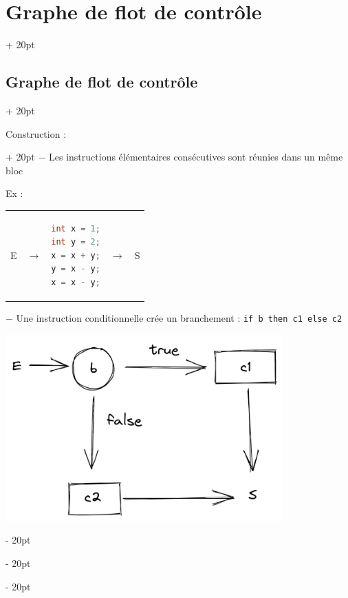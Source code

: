 \documentclass[a4paper, 12pt, twoside]{article}
\newcommand{\ind}[1][20pt]{\advance\leftskip + #1}
\newcommand{\deind}[1][20pt]{\advance\leftskip - #1}
\newenvironment{indentedenv}[1][20pt]{\par \ind[#1]}{\par \deind}
\newenvironment{indt}[2][20pt]{#2 \begin{indentedenv}[#1]}{\end{indentedenv}} %
\begin{document}
\begin{indt}{\section{Graphe de flot de contrôle}}
\begin{indt}{\subsection{Graphe de flot de contrôle}}
            \vspace{12pt}
            
            \begin{indt}{Construction :}
                $-$ Les instructions élémentaires consécutives sont réunies dans un même bloc
                
                Ex :
                \begin{tabular}{ccccc}
                    E
                    &
                    $\rightarrow$
                    &
                    \begin{lstlisting}[language=C]
int x = 1;
int y = 2;
x = x + y;
y = x - y;
x = x - y;\end{lstlisting}
                    &
                    $\rightarrow$
                    &
                    S
                \end{tabular}
                
                \vspace{12pt}
                
                $-$ Une instruction conditionnelle crée un branchement :
                \texttt{if b then c1 else c2}
                
                
                \begin{center}
                    \includegraphics[scale=.3]{draw/draw0.png}
                \end{center}
                

\end{indt}
\end{indt}
\end{indt}
\end{document}
